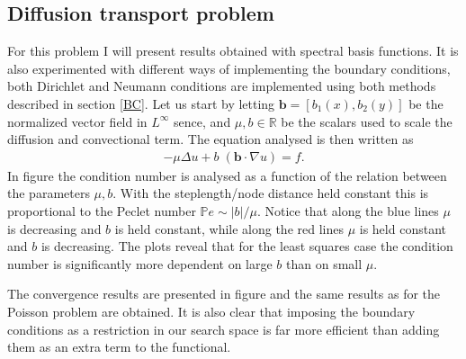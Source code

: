 \subsection{Diffusion transport problem}
For this problem I will present results obtained with spectral basis functions. It is also experimented with different ways of implementing the boundary conditions, both Dirichlet and Neumann conditions are implemented using both methods described in section \ref{BC}.
Let us start by letting $\mathbf{b} = [b_1(x),b_2(y)] $ be the normalized vector field in $L^{\infty}$ sence, and  $\mu,b \in \mathbb{R}$ be the scalars used to scale the diffusion and convectional term. The equation analysed is then written as 
\begin{align}
	-\mu \Delta u + b \; (\mathbf{b} \cdot \nabla u) = f .
	\label{eq:difftransForConditionNumberPlotting}
\end{align}
In figure the condition number is analysed as a function of the relation between the parameters $\mu,b$. With the steplength/node distance held constant this is proportional to the Peclet number $\mathbb{P}e \sim |b|/\mu$. Notice that along the blue lines $\mu$ is decreasing and $b$ is held constant, while along the red lines $\mu$ is held constant and $b$ is decreasing. The plots reveal that for the least squares case the condition number is significantly more dependent on large $b$ than on small $\mu$. 

The convergence results are presented in figure and the same results as for the Poisson problem are obtained. It is also clear that imposing the boundary conditions as a restriction in our search space is far more efficient than adding them as an extra term to the functional. 

